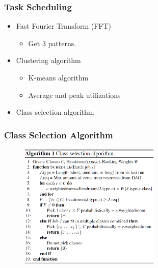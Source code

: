 \documentclass{beamer}
\begin{document}
	\begin{frame}
	\frametitle{Task Scheduling}
		\begin{itemize}
		\item Fast Fourier Transform (FFT)
			\begin{itemize}
			\item Get 3 patterns.
			\end{itemize}
		\item Clustering algorithm
			\begin{itemize}
			\item K-means algorithm
			\item Average and peak utilizations
			\end{itemize}
		\item Class selection algorithm
		\end{itemize}
	\end{frame}

	\begin{frame}
	\frametitle{Class Selection Algorithm}
		\begin{figure}[h!]
		\centering
		\includegraphics[width=0.6\textwidth]{./figure/algorithm1.PNG}
		\end{figure}
	\end{frame}

\end{document}
